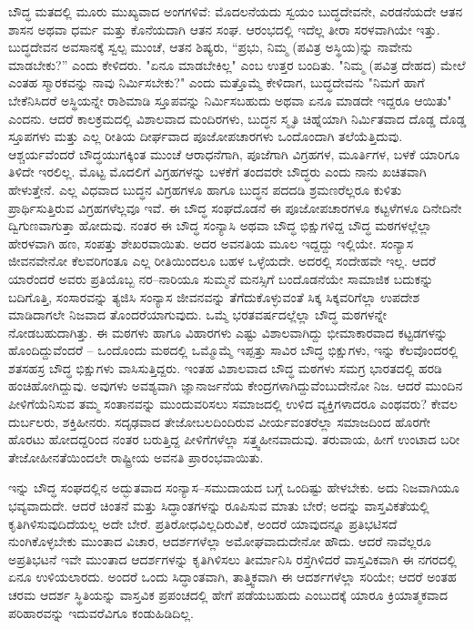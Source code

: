 ಬೌದ್ಧ ಮತದಲ್ಲಿ ಮೂರು ಮುಖ್ಯವಾದ ಅಂಗಗಳಿವೆ: ಮೊದಲನೆಯದು ಸ್ವಯಂ ಬುದ್ಧದೇವನೇ, ಎರಡನೆಯದೇ ಆತನ ಶಾಸನ ಅಥವಾ ಧರ್ಮ ಮತ್ತು ಕೊನೆಯದಾಗಿ ಆತನ ಸಂಘ. ಆರಂಭದಲ್ಲಿ ಇದೆಲ್ಲ ತೀರಾ ಸರಳವಾಗಿಯೇ ಇತ್ತು. ಬುದ್ಧದೇವನ ಅವಸಾನಕ್ಕೆ ಸ್ವಲ್ಪ ಮುಂಚೆ, ಆತನ ಶಿಷ್ಯರು, “ಪ್ರಭು, ನಿಮ್ಮ (ಪವಿತ್ರ ಅಸ್ಥಿಯ)ನ್ನು ನಾವೇನು ಮಾಡಬೇಕು?” ಎಂದು ಕೇಳಿದರು. "ಏನೂ ಮಾಡಬೇಕಿಲ್ಲ" ಎಂಬ ಉತ್ತರ ಬಂದಿತು. "ನಿಮ್ಮ (ಪವಿತ್ರ ದೇಹದ) ಮೇಲೆ ಎಂತಹ ಸ್ಮಾರಕವನ್ನು ನಾವು ನಿರ್ಮಿಸಬೇಕು?" ಎಂದು ಮತ್ತೊಮ್ಮೆ ಕೇಳಿದಾಗ, ಬುದ್ಧದೇವನು "ನಿಮಗೆ ಹಾಗೆ ಬೇಕೆನಿಸಿದರೆ ಅಸ್ಥಿಯನ್ನೇ ರಾಶಿಮಾಡಿ ಸ್ತೂಪವನ್ನು ನಿರ್ಮಿಸಬಹುದು ಅಥವಾ ಏನೂ ಮಾಡದೇ ಇದ್ದರೂ ಆಯಿತು" ಎಂದನು. ಆದರೆ ಕಾಲಕ್ರಮದಲ್ಲಿ ವಿಶಾಲವಾದ ಮಂದಿರಗಳು, ಬುದ್ಧನ ಸ್ಮೃತಿ ಚಿಹ್ನೆಯಾಗಿ ನಿರ್ಮಿತವಾದ ದೊಡ್ಡ ದೊಡ್ಡ ಸ್ತೂಪಗಳು ಮತ್ತು ಎಲ್ಲ ರೀತಿಯ ದೀರ್ಘವಾದ ಪೂಜೋಪಚಾರಗಳು ಒಂದೊಂದಾಗಿ ತಲೆಯೆತ್ತಿದುವು. ಆಶ್ಚರ್ಯವೆಂದರೆ ಬೌದ್ಧಯುಗಕ್ಕಿಂತ ಮುಂಚೆ ಆರಾಧನೆಗಾಗಿ, ಪೂಜೆಗಾಗಿ ವಿಗ್ರಹಗಳ, ಮೂರ್ತಿಗಳ, ಬಳಕೆ ಯಾರಿಗೂ ತಿಳಿದೇ ಇರಲಿಲ್ಲ. ಮೊಟ್ಟ ಮೊದಲಿಗೆ ವಿಗ್ರಹಗಳನ್ನು ಬಳಕೆಗೆ ತಂದವರೇ ಬೌದ್ಧರು ಎಂದು ನಾನು ಖಚಿತವಾಗಿ ಹೇಳುತ್ತೇನೆ. ಎಲ್ಲ ವಿಧವಾದ ಬುದ್ಧನ ವಿಗ್ರಹಗಳೂ ಹಾಗೂ ಬುದ್ಧನ ಪದದಡಿ ಶ್ರಮಣರೆಲ್ಲರೂ ಕುಳಿತು ಪ್ರಾರ್ಥಿಸುತ್ತಿರುವ ವಿಗ್ರಹಗಳೆಲ್ಲವೂ ಇವೆ. ಈ ಬೌದ್ಧ ಸಂಘದೊಡನೆ ಈ ಪೂಜೋಪಚಾರಗಳೂ ಕಟ್ಟಳೆಗಳೂ ದಿನೇದಿನೇ ದ್ವಿಗುಣವಾಗುತ್ತಾ ಹೋದುವು. ನಂತರ ಈ ಬೌದ್ಧ ಸಂನ್ಯಾಸಿ ಅಥವಾ ಬೌದ್ಧ ಭಿಕ್ಷುಗಳಿದ್ದ ಬೌದ್ಧ ಮಠಗಳಲ್ಲೆಲ್ಲಾ ಹೇರಳವಾಗಿ ಹಣ, ಸಂಪತ್ತು ಶೇಖರವಾಯಿತು. ಅದರ ಅವನತಿಯ ಮೂಲ ಇದ್ದದ್ದು ಇಲ್ಲಿಯೇ. ಸಂನ್ಯಾಸ ಜೀವನವೇನೋ ಕೆಲವರಿಗಂತೂ ಎಲ್ಲ ರೀತಿಯಿಂದಲೂ ಬಹಳ ಒಳ್ಳೆಯದೇ. ಅದರಲ್ಲಿ ಸಂದೇಹವೇ ಇಲ್ಲ. ಆದರೆ ಯಾರೆಂದರೆ ಅವರು ಪ್ರತಿಯೊಬ್ಬ ನರ–ನಾರಿಯೂ ಸುಮ್ಮನೆ ಮನಸ್ಸಿಗೆ ಬಂದೊಡನೆಯೇ ಸಾಮಾಜಿಕ ಬದುಕನ್ನು ಬದಿಗೊತ್ತಿ, ಸಂಸಾರವನ್ನು ತ್ಯಜಿಸಿ ಸಂನ್ಯಾಸ ಜೀವನವನ್ನು ತೆಗೆದುಕೊಳ್ಳುವಂತೆ ಸಿಕ್ಕ ಸಿಕ್ಕವರಿಗೆಲ್ಲಾ ಉಪದೇಶ ಮಾಡಿದಾಗಲೇ ನಿಜವಾದ ತೊಂದರೆಯಾಗುವುದು. ಒಮ್ಮೆ ಭರತವರ್ಷದಲ್ಲೆಲ್ಲಾ ಬೌದ್ಧ ಮಠಗಳನ್ನೇ ನೋಡಬಹುದಾಗಿತ್ತು. ಈ ಮಠಗಳು ಹಾಗೂ ವಿಹಾರಗಳು ಎಷ್ಟು ವಿಶಾಲವಾಗಿದ್ದು ಭೀಮಾಕಾರವಾದ ಕಟ್ಟಡಗಳನ್ನು ಹೊಂದಿದ್ದುವೆಂದರೆ – ಒಂದೊಂದು ಮಠದಲ್ಲಿ ಒಮ್ಮೊಮ್ಮೆ ಇಪ್ಪತ್ತು ಸಾವಿರ ಬೌದ್ಧ ಭಿಕ್ಷುಗಳು, ಇನ್ನು ಕೆಲವೊಂದರಲ್ಲಿ ಶತಸಹಸ್ರ ಬೌದ್ಧ ಭಿಕ್ಷುಗಳು ವಾಸಿಸುತ್ತಿದ್ದರು. ಇಂತಹ ವಿಶಾಲವಾದ ಬೌದ್ಧ ಮಠಗಳು ಸಮಗ್ರ ಭಾರತದಲ್ಲಿ ಹರಡಿ ಹಂಚಿಹೋಗಿದ್ದುವು. ಅವುಗಳು ಅವಶ್ಯವಾಗಿ ಜ್ಞಾನಾರ್ಜನೆಯ ಕೇಂದ್ರಗಳಾಗಿದ್ದುವೆಂಬುದೇನೋ ನಿಜ. ಆದರೆ ಮುಂದಿನ ಪೀಳಿಗೆಯೆನಿಸುವ ತಮ್ಮ ಸಂತಾನವನ್ನು ಮುಂದುವರಿಸಲು ಸಮಾಜದಲ್ಲಿ ಉಳಿದ ವ್ಯಕ್ತಿಗಳಾದರೂ ಎಂಥವರು? ಕೇವಲ ದುರ್ಬಲರು, ಶಕ್ತಿಹೀನರು. ಸದೃಢವಾದ ತೇಜೋಬಲದಿಂದಿರುವ ವೀರ್ಯವಂತರೆಲ್ಲಾ ಸಮಾಜದಿಂದ ಹೊರಗೇ ಹೊರಟು ಹೋದದ್ದರಿಂದ ನಂತರ ಬರುತ್ತಿದ್ದ ಪೀಳಿಗೆಗಳೆಲ್ಲಾ ಸತ್ತ್ವಹೀನವಾದುವು. ತರುವಾಯ, ಹೀಗೆ ಉಂಟಾದ ಬರೀ ತೇಜೋಹೀನತೆಯಿಂದಲೇ ರಾಷ್ಟ್ರೀಯ ಅವನತಿ ಪ್ರಾರಂಭವಾಯಿತು.

ಇನ್ನು ಬೌದ್ಧ ಸಂಘದಲ್ಲಿನ ಅದ್ಭುತವಾದ ಸಂನ್ಯಾಸ–ಸಮುದಾಯದ ಬಗ್ಗೆ ಒಂದಿಷ್ಟು ಹೇಳಬೇಕು. ಅದು ನಿಜವಾಗಿಯೂ ಭವ್ಯವಾದುದೇ. ಆದರೆ ಚಿಂತನೆ ಮತ್ತು ಸಿದ್ಧಾಂತಗಳನ್ನು ರೂಪಿಸುವ ಮಾತು ಬೇರೆ; ಅದನ್ನು ವಾಸ್ತವಿಕತೆಯಲ್ಲಿ ಕೃತಿಗಿಳಿಸುವುದಿದೆಯಲ್ಲ ಅದೇ ಬೇರೆ. ಪ್ರತಿರೋಧವಿಲ್ಲದಿರುವಿಕೆ, ಅಂದರೆ ಯಾವುದನ್ನೂ ಪ್ರತಿಭಟಿಸದೆ ನುಂಗಿಕೊಳ್ಳಬೇಕು ಮುಂತಾದ ವಿಚಾರ, ಆದರ್ಶಗಳೆಲ್ಲಾ ಅಮೋಘವಾದುದೇನೋ ಹೌದು. ಆದರೆ ನಾವೆಲ್ಲರೂ ಅಪ್ರತಿಭಟನೆ ಇವೇ ಮುಂತಾದ ಆದರ್ಶಗಳನ್ನು ಕೃತಿಗಿಳಿಸಲು ತೀರ್ಮಾನಿಸಿ ರಸ್ತೆಗಿಳಿದರೆ ವಾಸ್ತವಿಕವಾಗಿ ಈ ನಗರದಲ್ಲಿ ಏನೂ ಉಳಿಯಲಾರದು. ಅಂದರೆ ಒಂದು ಸಿದ್ಧಾಂತವಾಗಿ, ತಾತ್ತ್ವಿಕವಾಗಿ ಈ ಆದರ್ಶಗಳೆಲ್ಲಾ ಸರಿಯೇ; ಆದರೆ ಅಂತಹ ಚರಮ ಆದರ್ಶ ಸ್ಥಿತಿಯನ್ನು ವಾಸ್ತವಿಕ ಪ್ರಪಂಚದಲ್ಲಿ ಹೇಗೆ ಪಡೆಯಬಹುದು ಎಂಬುದಕ್ಕೆ ಯಾರೂ ಕ್ರಿಯಾತ್ಮಕವಾದ ಪರಿಹಾರವನ್ನು ಇದುವರೆವಿಗೂ ಕಂಡುಹಿಡಿದಿಲ್ಲ.

